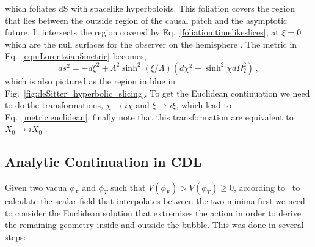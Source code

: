 \documentclass[a4paper,11pt]{article}
\numberwithin{equation}{section}
\begin{document}
which foliates dS  with spacelike hyperboloids. This foliation covers the  region that lies between the outside region of  the causal patch and the asymptotic future. It intersects the region covered by Eq.~\eqref{foliation:timelikeslices}, at $\xi=0$ which are the null surfaces for the observer on the hemisphere . The metric in Eq.~\eqref{eqn:Lorentzian5metric} becomes,
\begin{equation}
ds^2=-d\xi^2+\Lambda^2\sinh^2(\xi/\Lambda)\left(d\chi^2+\sinh^2\chi d\Omega_2^2\right) \,,
\label{eqn:opendeSitter}
\end{equation}
which is also  pictured as the region in blue in Fig.~\ref{fig:deSitter_hyperbolic_slicing}.
To get  the Euclidean continuation we need to do the transformations, $\chi\to i \chi$  and $\xi\to i \xi$, which lead to Eq.~\eqref{metric:euclidean}. finally note that  this transformation are equivalent to $X_0\to iX_0$ .




\subsection{Analytic Continuation in CDL }
\label{sec:CDLReview}


Given two vacua $\phi_F$ and $\phi_T$ such that $V(\phi_F)>V(\phi_T)\geq 0$, according to~\cite{Coleman:1980aw}  to calculate the scalar field that interpolates between the two minima first we need to consider the Euclidean solution that extremises the action in order to derive the remaining geometry inside and outside the bubble. This was done in several steps:
\end{document}
